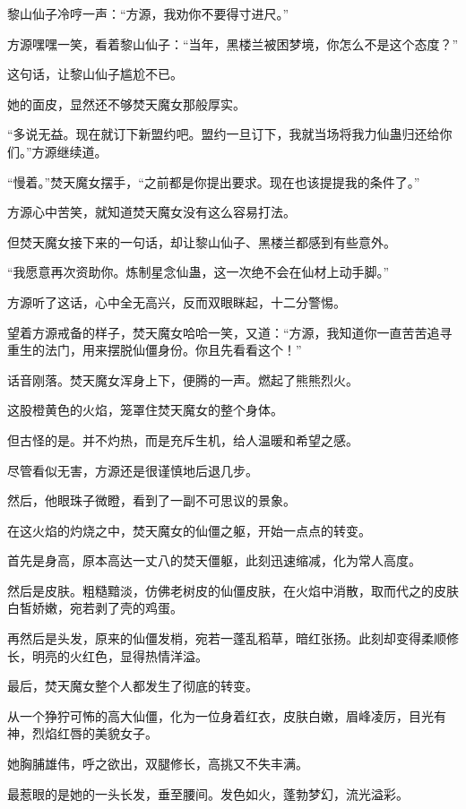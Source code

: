\begin{this_body}
黎山仙子冷哼一声：“方源，我劝你不要得寸进尺。”

方源嘿嘿一笑，看着黎山仙子：“当年，黑楼兰被困梦境，你怎么不是这个态度？”

这句话，让黎山仙子尴尬不已。

她的面皮，显然还不够焚天魔女那般厚实。

“多说无益。现在就订下新盟约吧。盟约一旦订下，我就当场将我力仙蛊归还给你们。”方源继续道。

“慢着。”焚天魔女摆手，“之前都是你提出要求。现在也该提提我的条件了。”

方源心中苦笑，就知道焚天魔女没有这么容易打法。

但焚天魔女接下来的一句话，却让黎山仙子、黑楼兰都感到有些意外。

“我愿意再次资助你。炼制星念仙蛊，这一次绝不会在仙材上动手脚。”

方源听了这话，心中全无高兴，反而双眼眯起，十二分警惕。

望着方源戒备的样子，焚天魔女哈哈一笑，又道：“方源，我知道你一直苦苦追寻重生的法门，用来摆脱仙僵身份。你且先看看这个！”

话音刚落。焚天魔女浑身上下，便腾的一声。燃起了熊熊烈火。

这股橙黄色的火焰，笼罩住焚天魔女的整个身体。

但古怪的是。并不灼热，而是充斥生机，给人温暖和希望之感。

尽管看似无害，方源还是很谨慎地后退几步。

然后，他眼珠子微瞪，看到了一副不可思议的景象。

在这火焰的灼烧之中，焚天魔女的仙僵之躯，开始一点点的转变。

首先是身高，原本高达一丈八的焚天僵躯，此刻迅速缩减，化为常人高度。

然后是皮肤。粗糙黯淡，仿佛老树皮的仙僵皮肤，在火焰中消散，取而代之的皮肤白皙娇嫩，宛若剥了壳的鸡蛋。

再然后是头发，原来的仙僵发梢，宛若一蓬乱稻草，暗红张扬。此刻却变得柔顺修长，明亮的火红色，显得热情洋溢。

最后，焚天魔女整个人都发生了彻底的转变。

从一个狰狞可怖的高大仙僵，化为一位身着红衣，皮肤白嫩，眉峰凌厉，目光有神，烈焰红唇的美貌女子。

她胸脯雄伟，呼之欲出，双腿修长，高挑又不失丰满。

最惹眼的是她的一头长发，垂至腰间。发色如火，蓬勃梦幻，流光溢彩。


\end{this_body}
